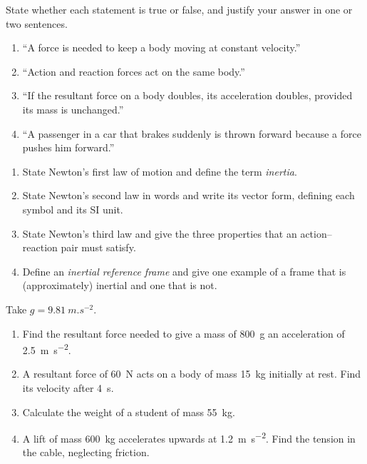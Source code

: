 \documentclass[11pt]{article}
\begin{document}
\begin{exercice}
State whether each statement is true or false, and justify your answer in one or two sentences.
\begin{enumerate}
\item ``A force is needed to keep a body moving at constant velocity.''
\item ``Action and reaction forces act on the same body.''
\item ``If the resultant force on a body doubles, its acceleration doubles, provided its mass is unchanged.''
\item ``A passenger in a car that brakes suddenly is thrown forward because a force pushes him forward.''
\end{enumerate}
\end{exercice}

\begin{exercice}
\begin{enumerate}
\item State Newton's first law of motion and define the term \emph{inertia}.
\item State Newton's second law in words and write its vector form, defining each symbol and its SI unit.
\item State Newton's third law and give the three properties that an action--reaction pair must satisfy.
\item Define an \emph{inertial reference frame} and give one example of a frame that is (approximately) inertial and one that is not.
\end{enumerate}
\end{exercice}

\begin{exercice}
Take $g = \SI{9.81}{m.s^{-2}}$.
\begin{enumerate}
\item Find the resultant force needed to give a mass of \SI{800}{g} an acceleration of \SI{2.5}{m.s^{-2}}.
\item A resultant force of \SI{60}{N} acts on a body of mass \SI{15}{kg} initially at rest. Find its velocity after \SI{4}{s}.
\item Calculate the weight of a student of mass \SI{55}{kg}.
\item A lift of mass \SI{600}{kg} accelerates upwards at \SI{1.2}{m.s^{-2}}. Find the tension in the cable, neglecting friction.
\end{enumerate}
\end{exercice}
\end{document}
